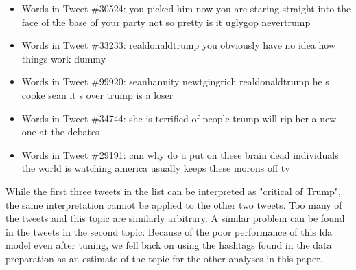 \documentclass{article}
\begin{document}
  \begin{itemize}
    \item Words in Tweet \#30524: you picked him now you are staring
      straight into the face of the base of your party not so pretty is it uglygop nevertrump
    \item Words in Tweet \#33233:  realdonaldtrump you obviously have
      no idea how things work dummy
    \item Words in Tweet \#99920:  seanhannity newtgingrich
      realdonaldtrump he s cooke sean it s over trump is a loser
    \item Words in Tweet \#34744: she is terrified of people trump will
      rip her a new one at the debates
    \item Words in Tweet \#29191:  cnn why do u put on these brain dead individuals the world is watching america usually keeps these morons off tv 
  \end{itemize}

  While the first three tweets in the list can be interpreted as
  "critical of Trump", the same interpretation cannot be applied to
  the other two tweets. Too many of the tweets and this topic are
  similarly arbitrary. A similar problem can be found in
  the tweets in the second topic. Because of the poor performance of
  this lda model even after tuning, we fell back on using the hashtags
  found in the data preparation as an estimate of the topic for the
  other analyses in this paper. 

\end{document}

